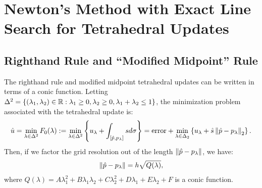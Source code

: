 \documentclass[eikonal.tex]{subfiles}
\begin{document}
\section{Newton's Method with Exact Line Search for Tetrahedral Updates}

\subsection{Righthand Rule and ``Modified Midpoint'' Rule}

The righthand rule and modified midpoint tetrahedral updates can be
written in terms of a conic function. Letting
$\Delta^2 = \left\{(\lambda_1, \lambda_2) \in \mathbb{R} : \lambda_1 \geq 0,
  \lambda_2 \geq 0, \lambda_1 + \lambda_2 \leq 1\right\}$, the minimization
problem associated with the tetrahedral update is:
\begin{align*}
  \hat{u} = \min_{\lambda \in \Delta^2} F_0(\lambda) := \min_{\lambda \in \Delta^2} \left\{u_\lambda + \int_{[\hat{p}, p_\lambda]} s d\sigma\right\} = \mbox{error} + \min_{\lambda \in \Delta_2} \left\{u_\lambda + \hat{s} \left\|\hat{p} - p_\lambda\right\|_2\right\}.
\end{align*}
Then, if we factor the grid resolution out of the length
$\left\|\hat{p} - p_\lambda\right\|$, we have:
\begin{align*}
  \left\|\hat{p} - p_\lambda\right\| = h \sqrt{Q(\lambda)},
\end{align*}
where
$Q(\lambda) = A\lambda_1^2 + B\lambda_1\lambda_2 + C\lambda_2^2 +
D\lambda_1 + E\lambda_2 + F$ is a conic function.
\end{document}
